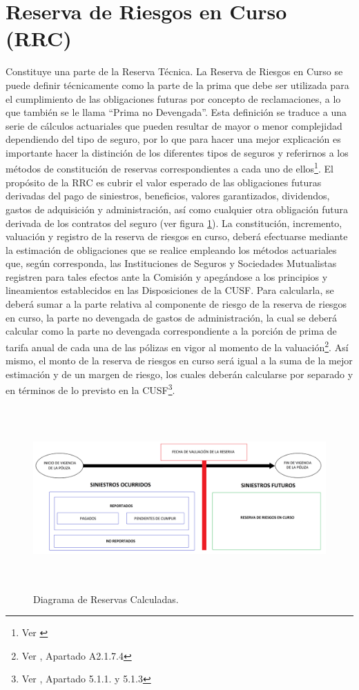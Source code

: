 \documentclass[11pt,twoside,openright,spanish]{report}
\numberwithin{equation}{chapter}
\numberwithin{figure}{chapter}
\numberwithin{table}{chapter}
\begin{document}
	\section{Reserva de Riesgos en Curso (RRC)}
Constituye una parte de la Reserva Técnica. La Reserva de Riesgos en Curso se puede definir técnicamente como la parte de la prima que debe ser utilizada para el cumplimiento de las obligaciones futuras por concepto de reclamaciones, a lo que también se le llama “Prima no Devengada”. Esta definición se traduce a una serie de cálculos actuariales que pueden resultar de mayor o menor complejidad dependiendo del tipo de seguro, por lo que para hacer una mejor explicación es importante hacer la distinción de los diferentes tipos de seguros y referirnos a los métodos de constitución de reservas correspondientes a cada uno de ellos\footnote{Ver \citet{RResAssal}}. El propósito de la RRC es cubrir el valor esperado de las obligaciones futuras derivadas del pago de siniestros, beneficios, valores garantizados, dividendos, gastos de adquisición y administración, así como cualquier otra obligación futura derivada de los contratos del seguro (ver figura \ref{reserva}).
La constitución, incremento, valuación y registro de la reserva de riesgos en curso, deberá efectuarse mediante la estimación de obligaciones que se realice empleando los métodos actuariales que, según corresponda, las Instituciones de Seguros y Sociedades Mutualistas registren para tales efectos ante la Comisión y apegándose a los principios y lineamientos establecidos en las Disposiciones de la CUSF. Para calcularla, se deberá sumar a la parte relativa al componente de riesgo de la reserva de riesgos en curso, la parte no devengada de gastos de administración, la cual se deberá calcular como la parte no devengada correspondiente a la porción de prima de tarifa anual de cada una de las pólizas en vigor al momento de la valuación\footnote{Ver \citet{SAnexoCUSF}, Apartado A2.1.7.4}. Así mismo, el monto de la reserva de riesgos en curso será igual a la suma de la mejor estimación y de un margen de riesgo, los cuales deberán calcularse por separado y en términos de lo previsto en la CUSF\footnote{Ver \citet{HCusf}, Apartado 5.1.1. y 5.1.3}.

	\begin{figure}[h!]
	\centering
	\includegraphics[height=7cm]{Imagenes/Diagrama Reservas.png}
	\caption{Diagrama de Reservas Calculadas.}
	\label{reserva}
	\end{figure}
 
\end{document}
